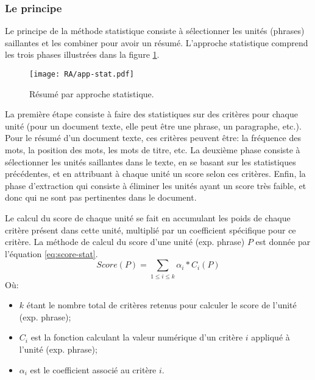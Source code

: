 \documentclass[a4paper,12pt,oneside]{../use/ESIthesis}
\begin{document}
\subsubsection{Le principe}

Le principe de la méthode statistique consiste à sélectionner les unités (phrases) saillantes et les combiner pour avoir un résumé. 
L'approche statistique comprend les trois phases illustrées dans la figure \ref{fig:app-stat}.

\begin{figure}[ht]
\begin{center}
\texttt{[image: RA/app-stat.pdf]} %
 \caption{Résumé par approche statistique.}
 \label{fig:app-stat}
\end{center}
\end{figure}

La première étape consiste à faire des statistiques sur des critères pour chaque unité (pour un document texte, elle peut être une phrase, un paragraphe, etc.). 
Pour le résumé d'un document texte, ces critères peuvent être: la fréquence des mots, la position des mots, les mots de titre, etc. 
La deuxième phase consiste à sélectionner les unités saillantes dans le texte, en se basant sur les statistiques précédentes, et en attribuant à chaque unité un score selon ces critères. 
Enfin, la phase d'extraction qui consiste à éliminer les unités ayant un score très faible, et donc qui ne sont pas pertinentes dans le document. 

Le calcul du score de chaque unité se fait en accumulant les poids de chaque critère présent dans cette unité, multiplié par un coefficient spécifique pour ce critère. 
La méthode de calcul du score d'une unité (exp. phrase) $P$ est donnée par l'équation \ref{eq:score-stat}. 
\begin{equation}
\label{eq:score-stat}
Score(P) = \sum_{1 \leq i \leq k} {\alpha_i * C_i(P)}
\end{equation}
Où:
\begin{itemize}
\item $k$ étant le nombre total de critères retenus pour calculer le score de l'unité (exp. phrase);
\item $C_i$ est la fonction calculant la valeur numérique d'un critère $ i $ appliqué à l'unité (exp. phrase);
\item $\alpha_i$ est le coefficient associé au critère $ i $.
\end{itemize}
\end{document}
